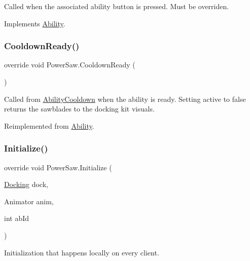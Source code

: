 Called when the associated ability button is pressed. Must be overriden. 



Implements \hyperlink{class_ability_a7722265862f8b29828315725415ce266}{Ability}.

\hypertarget{class_power_saw_af94a6750bc9f283d35c967f38717084d}{}\label{class_power_saw_af94a6750bc9f283d35c967f38717084d} 
\subsubsection{\texorpdfstring{Cooldown\+Ready()}{CooldownReady()}}
{\footnotesize\ttfamily override void Power\+Saw.\+Cooldown\+Ready (\begin{DoxyParamCaption}{ }\end{DoxyParamCaption})\hspace{0.3cm}{\ttfamily [virtual]}}



Called from \hyperlink{class_ability_cooldown}{Ability\+Cooldown} when the ability is ready. Setting active to false returns the sawblades to the docking kit visuals. 



Reimplemented from \hyperlink{class_ability_af5abb620807086a1752b17b276c76a2e}{Ability}.

\hypertarget{class_power_saw_ac695198ffe590b908e1c0c85f63fb792}{}\label{class_power_saw_ac695198ffe590b908e1c0c85f63fb792} 
\subsubsection{\texorpdfstring{Initialize()}{Initialize()}}
{\footnotesize\ttfamily override void Power\+Saw.\+Initialize (\begin{DoxyParamCaption}\item[{\hyperlink{class_docking}{Docking}}]{dock,  }\item[{Animator}]{anim,  }\item[{int}]{ab\+Id }\end{DoxyParamCaption})\hspace{0.3cm}{\ttfamily [virtual]}}



Initialization that happens locally on every client. 


